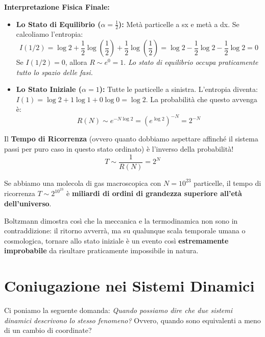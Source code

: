 \documentclass[openany]{book}
\theoremstyle{definition}
\theoremstyle{remark}
\begin{document}
\textbf{Interpretazione Fisica Finale:}
\begin{itemize}
    \item \textbf{Lo Stato di Equilibrio ($\alpha = \frac{1}{2}$):} Metà particelle a sx e metà a dx. Se calcoliamo l'entropia:
    \begin{equation*}
        I(1/2) = \log 2 + \frac{1}{2} \log\left(\frac{1}{2}\right) + \frac{1}{2} \log\left(\frac{1}{2}\right) = \log 2 - \frac{1}{2} \log 2 - \frac{1}{2} \log 2 = 0
    \end{equation*}
    Se $I(1/2) = 0$, allora $R \sim e^0 = 1$. \textit{Lo stato di equilibrio occupa praticamente tutto lo spazio delle fasi.}

    \item \textbf{Lo Stato Iniziale ($\alpha = 1$):} Tutte le particelle a sinistra.
    L'entropia diventa: $I(1) = \log 2 + 1 \log 1 + 0 \log 0 = \log 2$.
    La probabilità che questo avvenga è:
    \begin{equation*}
        R(N) \sim e^{-N \log 2} = (e^{\log 2})^{-N} = 2^{-N}
    \end{equation*}
\end{itemize}

Il \textbf{Tempo di Ricorrenza} (ovvero quanto dobbiamo aspettare affinché il sistema passi per puro caso in questo stato ordinato) è l'inverso della probabilità!
\begin{equation}
    T \sim \frac{1}{R(N)} = 2^N
\end{equation}

Se abbiamo una molecola di gas macroscopica con $N = 10^{23}$ particelle, il tempo di ricorrenza $T \sim 2^{10^{23}}$ è \textbf{miliardi di ordini di grandezza superiore all'età dell'universo}. 

Boltzmann dimostra così che la meccanica e la termodinamica non sono in contraddizione: il ritorno avverrà, ma su qualunque scala temporale umana o cosmologica, tornare allo stato iniziale è un evento così \textbf{estremamente improbabile} da risultare praticamente impossibile in natura.



\section{Coniugazione nei Sistemi Dinamici}

Ci poniamo la seguente domanda: \textit{Quando possiamo dire che due sistemi dinamici descrivono lo stesso fenomeno?} Ovvero, quando sono equivalenti a meno di un cambio di coordinate?
\end{document}

